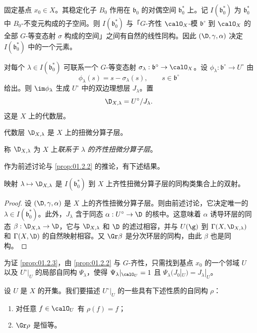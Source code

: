 固定基点 $x_0\in X$。其稳定化子 $B_0$ 作用在 $\mathfrak{b}_0$ 的对偶空间 $\mathfrak{b}_0^*$ 上。记 $I(\mathfrak{b}_0^*)$ 为 $\mathfrak{b}_0^*$ 中 $B_0$-不变元构成的子空间。则 $I(\mathfrak{b}_0^*)$ 与「$G$-齐性 $\calO_X$-模 $\mathfrak{b}^\circ$ 到 $\calO_X$ 的全部 $G$-等变态射 $\sigma$ 构成的空间」之间有自然的线性同构。因此 $(\D,\gamma,\alpha)$ 决定 $I(\mathfrak{b}_0^*)$ 中的一个元素。

对每个 $\lambda\in I(\mathfrak{b}_0^*)$ 可联系一个 $G$-等变态射 $\sigma_\lambda:\mathfrak{b}^\circ\to\calO_X$。设 $\phi_\lambda:\mathfrak{b}^\circ\to U^\circ$ 由
$$\phi_\lambda(s)=s-\sigma_\lambda(s),\qquad s\in\mathfrak{b}^\circ$$
给出。则 $\im\phi_\lambda$ 生成 $U^\circ$ 中的双边理想层 $J_\lambda$。置
$$\D_{X,\lambda}=U^\circ/J_\lambda.$$
这是 $X$ 上的代数层。

\begin{proposition}\label{prop:01.2.3}
代数层 $\D_{X,\lambda}$ 是 $X$ 上的扭微分算子层。
\end{proposition}

称 $\D_{X,\lambda}$ 为 $X$ 上\emph{联系于 $\lambda$ 的齐性扭微分算子层}。

作为前述讨论与 \ref{prop:01.2.2} 的推论，有下述结果。

\begin{theorem}\label{thm:01.2.4}
映射 $\lambda\mapsto\D_{X,\lambda}$ 是 $I(\mathfrak{b}_0^*)$ 到 $X$ 上齐性扭微分算子层的同构类集合上的双射。
\end{theorem}

\begin{proof}
设 $(\D,\gamma,\alpha)$ 是 $X$ 上的齐性扭微分算子层。则由前述讨论，它决定唯一的 $\lambda\in I(\mathfrak{b}_0^*)$。此外，$J_\lambda$ 含于同态 $\alpha:U^\circ\to\D$ 的核中。这意味着 $\alpha$ 诱导环层的同态 $\beta:\D_{X,\lambda}\to\D$，它与 $\D_{X,\lambda}$ 和 $\D$ 的滤过相容，并与 $U(\g)$ 到 $\Gamma(X,\D_{X,\lambda})$ 和 $\Gamma(X,\D)$ 的自然映射相容。又 $\Gr\beta$ 是分次环层的同构，由此 $\beta$ 也是同构。
\end{proof}

为证 \ref{prop:01.2.3}，由 \ref{prop:01.2.2} 与 $G$-齐性，只需找到基点 $x_0$ 的一个邻域 $U$ 以及 $U^\circ|_U$ 的局部自同构 $\Psi_\lambda$，使得 $\Psi_\lambda|_{\calO_U}=1$ 且 $\Psi_\lambda(J_0|_U)=J_\lambda|_U$。

设 $U$ 是 $X$ 的开集。我们要描述 $U^\circ|_U$ 的一些具有下述性质的自同构 $\rho$：

\begin{enumerate}[label=(\roman*)]
  \item 对任意 $f\in\calO_U$ 有 $\rho(f)=f$；
  \item $\Gr\rho$ 是恒等。
\end{enumerate}

